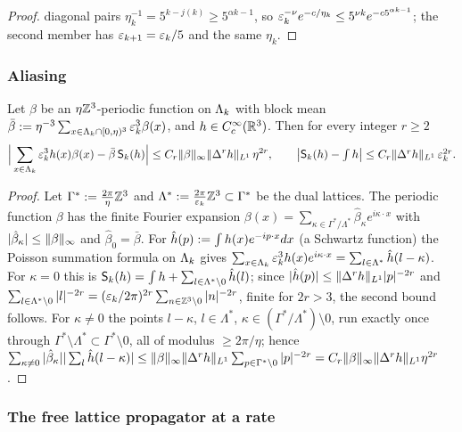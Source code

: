 \begin{proof}
diagonal pairs $\eta_k^{-1}=5^{k-j(k)}\ge5^{\alpha k-1}$, so $\varepsilon_k^{-\nu}e^{-c/\eta_k}\le5^{\nu k}e^{-c5^{\alpha k-1}}$; the second member has $\varepsilon_{k+1}=\varepsilon_k/5$ and the same $\eta_k$.
\end{proof}

\subsubsection{Aliasing}

\begin{lemma}[aliasing]\label{app:a04:lem:alias}
Let $\beta$ be an $\eta\mathbb Z^3$-periodic function on $\Lambda_k$ with block mean $\bar\beta:=\eta^{-3}\sum_{x\in\Lambda_k\cap[0,\eta)^3}\varepsilon_k^3\beta(x)$, and $h\in C^\infty_c(\mathbb R^3)$. Then for every integer $r\ge2$
\begin{equation}\label{app:a04:eq:alias}
\Big|\sum_{x\in\Lambda_k}\varepsilon_k^3h(x)\beta(x)-\bar\beta\,\mathsf S_k(h)\Big|\le C_r\lVert \beta\rVert_\infty\lVert \Delta^rh\rVert_{L^1}\,\eta^{2r},\qquad
\big|\mathsf S_k(h)-\textstyle\int h\big|\le C_r\lVert \Delta^rh\rVert_{L^1}\,\varepsilon_k^{2r}.
\end{equation}
\end{lemma}
\begin{proof}
Let $\Gamma^*:=\frac{2\pi}\eta\mathbb Z^3$ and $\Lambda^*:=\frac{2\pi}{\varepsilon_k}\mathbb Z^3\subset\Gamma^*$ be the dual lattices. The periodic function $\beta$ has the finite Fourier expansion $\beta(x)=\sum_{\kappa\in\Gamma^*/\Lambda^*}\hat\beta_\kappa e^{i\kappa\cdot x}$ with $|\hat\beta_\kappa|\le\lVert \beta\rVert_\infty$ and $\hat\beta_0=\bar\beta$. For $\hat h(p):=\int h(x)e^{-ip\cdot x}dx$ (a Schwartz function) the Poisson summation formula on $\Lambda_k$ gives $\sum_{x\in\Lambda_k}\varepsilon_k^3h(x)e^{i\kappa\cdot x}=\sum_{l\in\Lambda^*}\hat h(l-\kappa)$. For $\kappa=0$ this is $\mathsf S_k(h)=\int h+\sum_{l\in\Lambda^*\setminus0}\hat h(l)$; since $|\hat h(p)|\le\lVert \Delta^rh\rVert_{L^1}|p|^{-2r}$ and $\sum_{l\in\Lambda^*\setminus0}|l|^{-2r}=(\varepsilon_k/2\pi)^{2r}\sum_{n\in\mathbb Z^3\setminus0}|n|^{-2r}$, finite for $2r>3$, the second bound follows. For $\kappa\ne0$ the points $l-\kappa$, $l\in\Lambda^*$, $\kappa\in(\Gamma^*/\Lambda^*)\setminus0$, run exactly once through $\Gamma^*\setminus\Lambda^*\subset\Gamma^*\setminus0$, all of modulus $\ge2\pi/\eta$; hence $\sum_{\kappa\ne0}|\hat\beta_\kappa||\sum_l\hat h(l-\kappa)|\le\lVert \beta\rVert_\infty\lVert \Delta^rh\rVert_{L^1}\sum_{p\in\Gamma^*\setminus0}|p|^{-2r}=C_r\lVert \beta\rVert_\infty\lVert \Delta^rh\rVert_{L^1}\eta^{2r}$.
\end{proof}

\subsubsection{The free lattice propagator at a rate}

